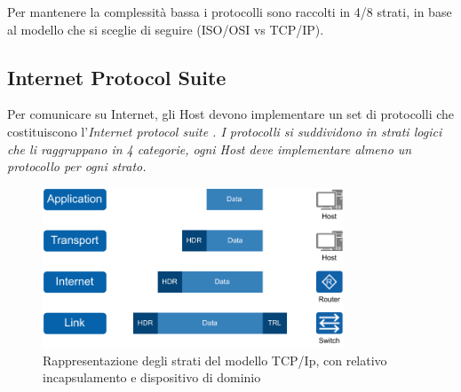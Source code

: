 Per mantenere la complessità bassa i protocolli sono raccolti in 4/8 strati, in base al modello che si sceglie di seguire (ISO/OSI vs TCP/IP).

\subsection{Internet Protocol Suite}

Per comunicare su Internet, gli Host devono implementare un set di protocolli che costituiscono l'\it{Internet protocol suite} \cite{RFC_1122}. I protocolli si suddividono in strati logici che li raggruppano in 4 categorie, ogni Host deve implementare almeno un protocollo per ogni strato.

\begin{figure}[H]
    \centering
    \includegraphics[width=0.8\textwidth]{immagini/diag2-modello_a_strati}
    \caption{Rappresentazione degli strati del modello TCP/Ip, con relativo incapsulamento e dispositivo di dominio}
    \label{fig:modello-a-strati}
\end{figure}



